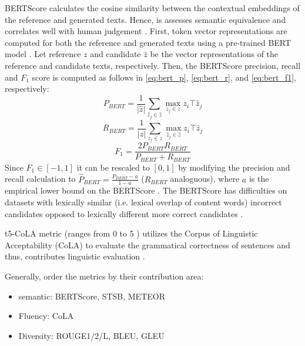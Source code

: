 BERTScore calculates the cosine similarity between the contextual embeddings of the reference and generated texts. 
Hence, is assesses semantic equivalence and correlates well with human judgement \citep{kurt_pehlivanoglu_comparative_2024}.
First, token vector representations are computed for both the reference and generated texts using a pre-trained BERT model \citep{hanna_fine_grained_2021}.
Let reference $z$ and candidate $\hat{z}$ be the vector representations of the reference and candidate texts, respectively.
Then, the BERTScore precision, recall and $F_1$ score is computed as follows in \autoref{eq:bert_p}, \autoref{eq:bert_r}, and \autoref{eq:bert_f1}, respectively:
\begin{equation}
    P_{BERT} = \frac{1}{|\hat{z}|} \sum_{\hat{z}_j \in \hat{z}} \max_{z_j \in z} z_i\top \hat{z}_j
\label{eq:bert_p}
\end{equation}
\begin{equation}
    R_{BERT} = \frac{1}{|z|} \sum_{z_j \in z} \max_{\hat{z}_j \in \hat{z}} z_i\top \hat{z}_j
\label{eq:bert_r}
\end{equation}
\begin{equation}
    F_1 = \frac{2 P_{BERT} R_{BERT}}{P_{BERT} + R_{BERT}} 
\label{eq:bert_f1}
\end{equation}
Since $F_1 \in \left[-1,1\right]$ it can be rescaled to $[0,1]$ by modifying the precision and recall calculation 
to $\hat{P}_{BERT} = \frac{P_{BERT} - a}{1 - a}$ ($R_{BERT}$ analoguous), where $a$ is the empirical lower bound on the BERTScore \citep{hanna_fine_grained_2021}.
The BERTScore has difficulties on datasets with lexically similar (i.e. lexical overlap of content words) incorrect candidates 
opposed to lexically different more correct candidates \citep{hanna_fine_grained_2021}.


\ac{t5}-CoLA metric (ranges from 0 to 5 \citep{kurt_pehlivanoglu_comparative_2024}) utilizes the Corpus of Linguistic Acceptability (CoLA) to evaluate the grammatical correctness of sentences and thus, 
contributes linguistic evaluation \citep{kurt_pehlivanoglu_comparative_2024}.

Generally, \citet{kurt_pehlivanoglu_comparative_2024} order the metrics by their contribution area:
\begin{itemize}
    \item semantic: BERTScore, STSB, METEOR
    \item Fluency: CoLA
    \item Diversity: ROUGE1/2/L, BLEU, GLEU
\end{itemize}

